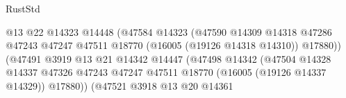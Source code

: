 \begin{lexlean}{RustStd}
\begin{coremodule}
                                                        @13
                                                        @22
                                                        @14323
                                                        @14448
                                                        (@47584
                                                          @14323
                                                          (@47590
                                                            @14309
                                                            @14318
                                                            @47286
                                                            @47243
                                                            @47247
                                                            @47511
                                                            @18770
                                                            (@16005 (@19126 @14318 @14310))
                                                            @17880))
                                                        (@47491
                                                          @3919
                                                          @13
                                                          @21
                                                          @14342
                                                          @14447
                                                          (@47498
                                                            @14342
                                                            (@47504
                                                              @14328
                                                              @14337
                                                              @47326
                                                              @47243
                                                              @47247
                                                              @47511
                                                              @18770
                                                              (@16005 (@19126 @14337 @14329))
                                                              @17880))
                                                          (@47521
                                                            @3918
                                                            @13
                                                            @20
                                                            @14361

\end{coremodule}
\end{lexlean}
